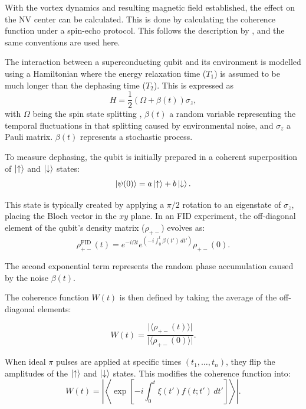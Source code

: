 With the vortex dynamics and resulting magnetic field established, the effect on the \gls{NV} center can be calculated. This is done by calculating the coherence function under a spin-echo protocol. This follows the description by \citeauthor*{cywinskiHowEnhanceDephasing2008}, and the same conventions are used here.

The interaction between a superconducting qubit and its environment is modelled using a Hamiltonian where the energy relaxation time ($T_1$) is assumed to be much longer than the dephasing time ($T_2$). This is expressed as
\begin{equation}
    H = \frac{1}{2} (\Omega + \beta(t)) \sigma_z,
\end{equation}
with $\Omega$ being the spin state splitting , $\beta(t)$ a random variable representing the temporal fluctuations in that splitting caused by environmental noise, and $\sigma_z$ a Pauli matrix. $\beta(t)$ represents a stochastic process.

To measure dephasing, the qubit is initially prepared in a coherent superposition of $\ket{\uparrow}$ and $\ket{\downarrow}$ states:
\begin{equation}
    |\psi(0)\rangle = a\ket{\uparrow} + b\ket{\downarrow}.
\end{equation}

This state is typically created by applying a $\pi/2$ rotation to an eigenstate of $\sigma_z$, placing the Bloch vector in the $xy$ plane. In an \gls{FID} experiment, the off-diagonal element of the qubit's density matrix ($\rho_{+-}$) evolves as:
\begin{equation}
    \rho_{+-}^{\text{FID}}(t) = e^{-i\Omega t} e^{\left(-i\int_{0}^{t} \beta(t') \, dt'\right)} \rho_{+-}(0).
\end{equation}

The second exponential term represents the random phase accumulation caused by the noise $\beta(t)$. 

The coherence function $W(t)$ is then defined by taking the average of the off-diagonal elements:

\begin{equation}
    W(t) = \frac{\lvert \langle \rho_{+-}(t) \rangle \rvert}{\lvert \langle \rho_{+-}(0) \rangle \rvert}.
\end{equation}

 When ideal $\pi$ pulses are applied at specific times $(t_1, \dots, t_n)$, they flip the amplitudes of the $\ket{\uparrow}$ and $\ket{\downarrow}$ states. This modifies the coherence function into:
\begin{equation}
    W(t) = \left\lvert\left\langle \exp\left[-i \int_{0}^{t} \xi(t') f(t; t') \, dt' \right] \right\rangle\right\rvert.
\end{equation}

